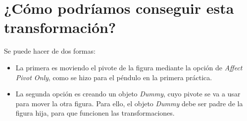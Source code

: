 \documentclass{article}
\begin{document}

\section{¿Cómo podríamos conseguir esta transformación?}


Se puede hacer de dos formas:

\begin{itemize}
    \item La primera es moviendo el pivote de la figura mediante la opción de \textit{Affect Pivot Only}, como se hizo para el péndulo en la primera práctica.
    
    
    \item La segunda opción es creando un objeto \textit{Dummy}, cuyo pivote se va a usar para mover la otra figura. Para ello, el objeto \textit{Dummy} debe ser padre de la figura hija, para que funcionen las transformaciones.
\end{itemize}
\end{document}
